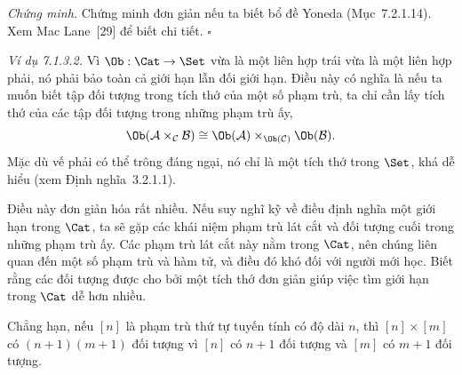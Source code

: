 \noindent\textit{Chứng minh.}
Chứng minh đơn giản nếu ta biết bổ đề Yoneda (Mục~7.2.1.14). Xem Mac Lane~[29] để biết chi tiết.
\hfill$\square$

\noindent\textit{Ví dụ 7.1.3.2.}\keepwithnext
Vì $\Ob:\Cat\to\Set$ vừa là một liên hợp trái vừa là một liên hợp phải, nó phải bảo toàn cả giới hạn lẫn đối giới hạn. Điều này có nghĩa là nếu ta muốn biết tập đối tượng trong tích thớ của một số phạm trù, ta chỉ cần lấy tích thớ của các tập đối tượng trong những phạm trù ấy,
\[
\Ob(\mathcal A\times_{\mathcal C}\mathcal B)\cong\Ob(\mathcal A)\times_{\Ob(\mathcal C)}\Ob(\mathcal B).
\]
Mặc dù vế phải có thể trông đáng ngại, nó chỉ là một tích thớ trong $\Set$, khá dễ hiểu (xem Định nghĩa~3.2.1.1).

Điều này đơn giản hóa rất nhiều. Nếu suy nghĩ kỹ về điều định nghĩa một giới hạn trong $\Cat$, ta sẽ gặp các khái niệm phạm trù lát cắt và đối tượng cuối trong những phạm trù ấy. Các phạm trù lát cắt này nằm trong $\Cat$, nên chúng liên quan đến một số phạm trù và hàm tử, và điều đó khó đối với người mới học. Biết rằng các đối tượng được cho bởi một tích thớ đơn giản giúp việc tìm giới hạn trong $\Cat$ dễ hơn nhiều.

Chẳng hạn, nếu $[n]$ là phạm trù thứ tự tuyến tính có độ dài $n$, thì $[n]\times[m]$ có $(n+1)(m+1)$ đối tượng vì $[n]$ có $n+1$ đối tượng và $[m]$ có $m+1$ đối tượng.

